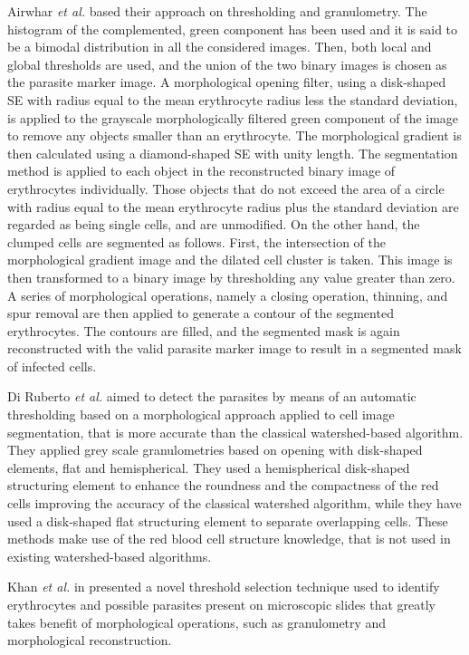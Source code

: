 \documentclass[sensors,review,submit,moreauthors,pdftex,10pt,a4paper]{mdpi}
\begin{document}
Airwhar \emph{et al.} \cite{Ahirwar2012} based their approach on thresholding and granulometry. The histogram of the complemented, green component has been used and it is said to be a bimodal distribution in all the considered images. Then, both local and global thresholds are used, and the union of the two binary images is chosen as the parasite marker image. A morphological opening filter, using a disk-shaped SE with radius equal to the mean erythrocyte radius less the standard deviation, is applied to the grayscale morphologically filtered green component of the image to remove any objects smaller than an erythrocyte. The morphological gradient is then calculated using a diamond-shaped SE with unity length. The segmentation method is applied to each object in the reconstructed binary image of erythrocytes individually. Those objects that do not exceed the area of a circle with radius equal to the mean erythrocyte radius plus the standard deviation are regarded as being single cells, and are unmodified.
On the other hand, the clumped cells are segmented as follows. First, the intersection of the morphological gradient image and the dilated cell cluster is taken. This image is then transformed to a binary image by thresholding any value greater than zero. A series of morphological operations, namely a closing operation, thinning, and spur removal are then applied to generate a contour of the segmented erythrocytes. The contours are filled, and the segmented mask is again reconstructed with the valid parasite marker image to result in a segmented mask of infected cells.

Di Ruberto \emph{et al.} \cite{DiRuberto2002} aimed to detect the parasites by means of an automatic thresholding based on a morphological approach applied to cell image segmentation, that is more accurate than the classical watershed-based algorithm. They applied grey scale granulometries based on opening with disk-shaped elements, flat and hemispherical. They used a hemispherical disk-shaped structuring element to enhance the roundness and the compactness of the red cells improving the accuracy of the classical watershed algorithm, while they have used a disk-shaped flat structuring element to separate overlapping cells. These methods make use of the red blood cell structure knowledge, that is not used in existing watershed-based algorithms.

Khan \emph{et al.} in \cite{Khan2011} presented a novel threshold selection technique used to identify erythrocytes and possible parasites present on microscopic slides that greatly takes benefit of morphological operations, such as granulometry and morphological reconstruction.
\end{document}
